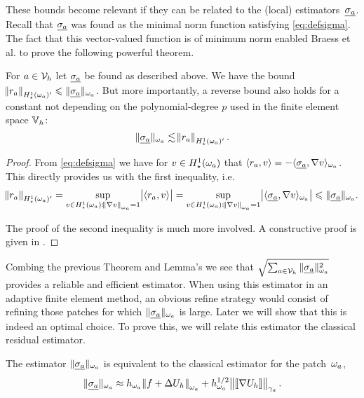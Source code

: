 \documentclass[thesis.tex]{subfiles}
\begin{document}
These bounds become relevant if they can be related to the (local) estimators~$\underline{\sigma_a}$. Recall that $\underline{\sigma_a}$
was found as the minimal norm function satisfying \eqref{eq:defsigma}. The fact that this vector-valued function is of minimum norm enabled Braess et al. \cite{braessequilrobust} to prove the following powerful theorem.
\begin{thm}
  \label{thm:locresequiv}
  For $a \in \mathcal{V}_h$ let $\underline{\sigma_a}$ be found as described above. 
  We have the bound $\norm{r_a}_{H_\star^1(\omega_a)'} \leqslant \| \underline{\sigma_a} \|_{\omega_a}$. But more importantly,
  a reverse bound also holds for a constant {not} depending on the polynomial-degree $p$ used in the finite element space $\mathbb{V}_h$:
  \[
    \| \underline{\sigma_a} \|_{\omega_a} \lesssim \norm{r_a}_{H_\star^1(\omega_a)'}.
  \]
\end{thm}
\begin{proof}
  From \eqref{eq:defsigma} we have for $v \in H_\star^1(\omega_a)$ that $\langle r_a, v \rangle = - \langle \underline{\sigma_a}, \nabla v \rangle_{\omega_a}$.
  This directly provides us with the first inequality, i.e.
  \[
    \norm{r_a}_{H_\star^1(\omega_a)'} = \sup_{v \in H_\star^1(\omega_a) : \norm{\nabla v}_{\omega_a} = 1} \abs{\langle r_a, v \rangle} = \sup_{v \in H_\star^1(\omega_a) : \norm{\nabla v}_{\omega_a}=1} \abs{\langle \underline{\sigma_a}, \nabla v \rangle_{\omega_a}} \leqslant \| \underline{\sigma_a} \|_{\omega_a}.
  \]

  The proof of the second inequality is much more involved. A constructive proof is given in \cite[Theorem~7]{braessequilrobust}.
\end{proof}
\begin{rem}
  Combing the previous Theorem and Lemma's we see that $\sqrt{\sum_{a \in \mathcal{V}_h} \| \underline{\sigma_a} \|^2_{\omega_a}}$ provides a reliable and efficient estimator.
  When using this estimator in an adaptive finite element method, an obvious refine strategy would consist
  of refining those patches for which $\| \underline{\sigma_a} \|_{\omega_a}$ is large. Later we will show that this is indeed
  an optimal choice. To prove this, we will relate this estimator the classical residual estimator.
\end{rem}
\begin{lem}
  \label{lem:starequiv}
  The estimator $\| \underline{\sigma_a} \|_{\omega_a}$ is equivalent to the classical estimator for the patch~$\omega_a$, 
  \[
    \| \underline{\sigma_a} \|_{\omega_a} \approx h_{\omega_a}\norm{f + \Delta U_h}_{\omega_a} + h^{1/2}_{\omega_a} \norm{\llbracket \nabla U_h  \rrbracket}_{\gamma_a}.
  \]
\end{lem}
\end{document}
